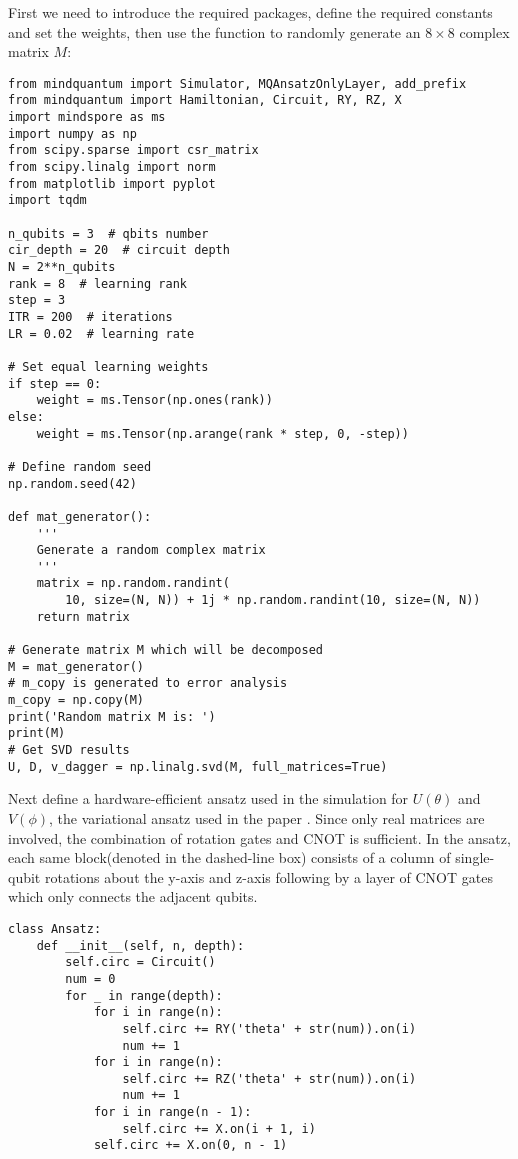 First we need to introduce the required packages, define the required constants and set the weights, then use the  function to randomly generate an $8 \times 8$ complex matrix $M$:
\begin{lstlisting}
from mindquantum import Simulator, MQAnsatzOnlyLayer, add_prefix
from mindquantum import Hamiltonian, Circuit, RY, RZ, X
import mindspore as ms
import numpy as np
from scipy.sparse import csr_matrix
from scipy.linalg import norm
from matplotlib import pyplot
import tqdm

n_qubits = 3  # qbits number
cir_depth = 20  # circuit depth
N = 2**n_qubits
rank = 8  # learning rank
step = 3
ITR = 200  # iterations
LR = 0.02  # learning rate

# Set equal learning weights
if step == 0:
    weight = ms.Tensor(np.ones(rank))
else:
    weight = ms.Tensor(np.arange(rank * step, 0, -step))

# Define random seed
np.random.seed(42)

def mat_generator():
    '''
    Generate a random complex matrix
    '''
    matrix = np.random.randint(
        10, size=(N, N)) + 1j * np.random.randint(10, size=(N, N))
    return matrix

# Generate matrix M which will be decomposed
M = mat_generator()
# m_copy is generated to error analysis
m_copy = np.copy(M)
print('Random matrix M is: ')
print(M)
# Get SVD results
U, D, v_dagger = np.linalg.svd(M, full_matrices=True)
\end{lstlisting}

Next define a hardware-efficient ansatz used in the simulation for $U(\theta)$ and $V(\phi)$, the variational ansatz used in the paper \cite{wang2021variational}. Since only real matrices are involved, the combination of rotation gates and CNOT is sufficient. In the ansatz, each same block(denoted in the dashed-line box) consists of a column of single-qubit rotations about the y-axis and z-axis following by a layer of CNOT gates which only connects the adjacent qubits.
\begin{lstlisting}
class Ansatz:
    def __init__(self, n, depth):
        self.circ = Circuit()
        num = 0
        for _ in range(depth):
            for i in range(n):
                self.circ += RY('theta' + str(num)).on(i)
                num += 1
            for i in range(n):
                self.circ += RZ('theta' + str(num)).on(i)
                num += 1
            for i in range(n - 1):
                self.circ += X.on(i + 1, i)
            self.circ += X.on(0, n - 1)
\end{lstlisting}

